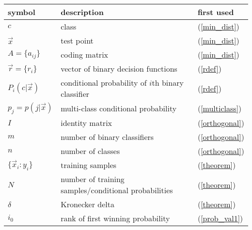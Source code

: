 \begin{tabular}{lll}
symbol & description & first used \\\hline
	$c$ & class & (\ref{min_dist}) \\
	$\vec x$ & test point & (\ref{min_dist})\\
	$A = \lbrace a_{ij} \rbrace$ & coding matrix & (\ref{min_dist})\\
	$\vec r = \lbrace r_i \rbrace$ & vector of binary decision functions & (\ref{rdef}) \\
	$P_i(c | \vec x)$ & conditional probability of $i$th binary classifier & (\ref{rdef})\\
	$p_j = p(j | \vec x)$ & multi-class conditional probability & (\ref{multiclass})\\
	$I$ & identity matrix & (\ref{orthogonal})\\
	$m$ & number of binary classifiers & (\ref{orthogonal}) \\
	$n$ & number of classes & (\ref{orthogonal})\\
	$\lbrace \vec x_i:y_i \rbrace$ & training samples & (\ref{theorem}) \\
	$N$ & number of training samples/conditional probabilities & (\ref{theorem})\\
	$\delta$ & Kronecker delta & (\ref{theorem}) \\
	$i_0$ & rank of first winning probability & (\ref{prob_val1})\\
\end{tabular}

